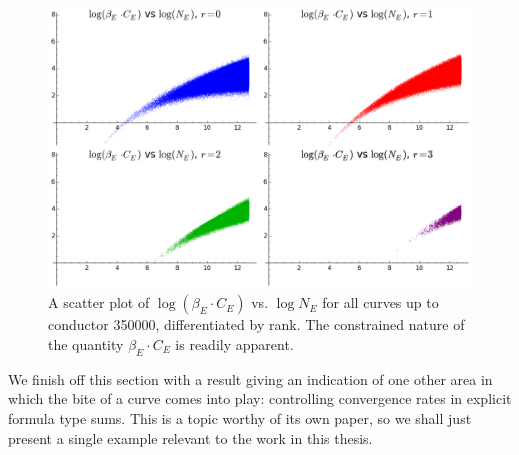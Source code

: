 \begin{figure}[!h]
    \centering
    \includegraphics[width=1.0\textwidth]{graphics/beta_times_C_vs_conductors_array.png}
    \caption{A scatter plot of $\log (\beta_E \cdot C_E) $ vs. $\log N_E$ for all curves up to conductor 350000, differentiated by rank. The constrained nature of the quantity $\beta_E \cdot C_E$ is readily apparent. }
    \label{fig:bites_vs_conductors_array}
\end{figure}

We finish off this section with a result giving an indication of one other area in which the bite of a curve comes into play: controlling convergence rates in explicit formula type sums. This is a topic worthy of its own paper, so we shall just present a single example relevant to the work in this thesis.

